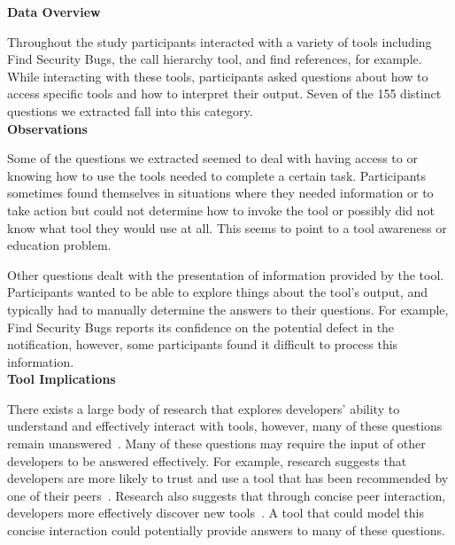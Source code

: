 \documentclass[conference]{IEEEtran}
\begin{document}
\noindent\textbf{Data Overview}

Throughout the study participants interacted with a variety of tools including Find Security Bugs, the call hierarchy tool, and find references, for example. 
While interacting with these tools, participants asked questions about how to access specific tools and how to interpret their output. 
Seven of the 155 distinct questions we extracted fall into this category.
\\

\noindent\textbf{Observations}

Some of the questions we extracted seemed to deal with having access to or knowing how to use the tools needed to complete a certain task. 
Participants sometimes found themselves in situations where they needed information or to take action but could not determine how to invoke the tool or possibly did not know what tool they would use at all. 
This seems to point to a tool awareness or education problem.

Other questions dealt with the presentation of information provided by the tool. 
Participants wanted to be able to explore things about the tool's output, and typically had to manually determine the answers to their questions. 
For example, Find Security Bugs reports its confidence on the potential defect in the notification, however, some participants found it difficult to process this information.
\\


\noindent\textbf{Tool Implications}

There exists a large body of research that explores developers' ability to understand and effectively interact with tools, however, many of these questions remain unanswered~\cite{ko2004designing, khoo2008path, johnson2013don}. 
Many of these questions may require the input of other developers to be answered effectively. 
For example, research suggests that developers are more likely to trust and use a tool that has been recommended by one of their peers~\cite{murphy2010trust}.
Research also suggests that through concise peer interaction, developers more effectively discover new tools~\cite{murphy2011peer}. 
A tool that could model this concise interaction could potentially provide answers to many of these questions.

\end{document}
